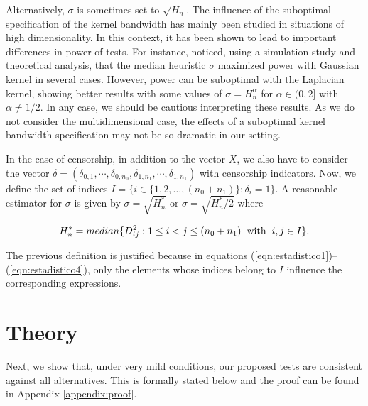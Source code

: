 \documentclass[11pt]{article}
\begin{document}
Alternatively, $\sigma$ is sometimes set to $ \sqrt{H_n}$.
The influence of the suboptimal specification of the kernel bandwidth has mainly been  studied  in situations of high dimensionality. In this context, it has been shown to lead to important differences in  power of  tests. For instance, \cite{ramdas2015decreasing}  noticed, using a simulation study and theoretical analysis,  that the median heuristic $\sigma$   maximized power with Gaussian kernel in several cases. However, power can be suboptimal with the Laplacian kernel, showing better results with some values of $\sigma=H_n^{\alpha}$ for $\alpha\in (0,2]$ with $\alpha\neq 1/2$. In any case, we should be cautious interpreting these results.  As we do not consider the multidimensional case, the effects of a suboptimal kernel bandwidth specification may not be so dramatic in our setting.


In the case of censorship, in addition to the vector  $X$, we also have to consider the  vector $\delta= (\delta_{0,1},\cdots,\delta_{0,n_0}, \delta_{1,n_1} ,\cdots, \delta_{1,n_1})$ with censorship indicators. Now, we define the set of indices $I=\{i\in\{1,2,\dots,(n_0+n_1)\}: \delta_i= 1 \}$. A reasonable estimator for $\sigma$  is given by  $\sigma= \sqrt{H_n^{*}}$ or $\sigma= \sqrt{H_n^{*}/2}$ where 
 
 $$H^{*}_{n}= median\{D_{ij}^{2}:1\leq i<j\leq (n_0+n_1) \hspace{0.2cm} \text{with} \hspace{0.2cm} i,j\in I\}.$$
 
 
 The previous definition is justified because   in equations  (\ref{eqn:estadistico1})--(\ref{eqn:estadistico4}), only the elements whose indices belong to $I$ influence  the corresponding expressions.  
 







\section{Theory}
\label{sec:theory}

Next, we show that,  under very mild conditions, our proposed  tests are consistent  against  all alternatives. This is formally stated  below and  the proof  can be found   in Appendix \ref{appendix:proof}.
\end{document}
